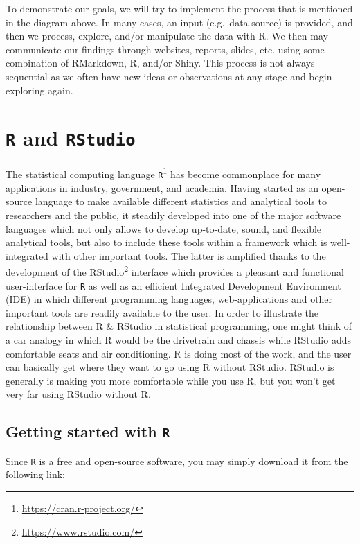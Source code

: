 \documentclass[12pt,]{krantz}
\renewcommand{\href}[2]{#2\footnote{\url{#1}}}
\begin{document}
To demonstrate our goals, we will try to implement the process that is
mentioned in the diagram above. In many cases, an input (e.g.~data
source) is provided, and then we process, explore, and/or manipulate the
data with R. We then may communicate our findings through websites,
reports, slides, etc. using some combination of RMarkdown, R, and/or
Shiny. This process is not always sequential as we often have new ideas
or observations at any stage and begin exploring again.

\section{\texorpdfstring{\texttt{R} and
\texttt{RStudio}}{R and RStudio}}\label{r-and-rstudio}

The statistical computing language
\href{https://cran.r-project.org/}{\texttt{R}} has become commonplace
for many applications in industry, government, and academia. Having
started as an open-source language to make available different
statistics and analytical tools to researchers and the public, it
steadily developed into one of the major software languages which not
only allows to develop up-to-date, sound, and flexible analytical tools,
but also to include these tools within a framework which is
well-integrated with other important tools. The latter is amplified
thanks to the development of the
\href{https://www.rstudio.com/}{RStudio} interface which provides a
pleasant and functional user-interface for \texttt{R} as well as an
efficient Integrated Development Environment (IDE) in which different
programming languages, web-applications and other important tools are
readily available to the user. In order to illustrate the relationship
between R \& RStudio in statistical programming, one might think of a
car analogy in which R would be the drivetrain and chassis while RStudio
adds comfortable seats and air conditioning. R is doing most of the
work, and the user can basically get where they want to go using R
without RStudio. RStudio is generally is making you more comfortable
while you use R, but you won't get very far using RStudio without R.

\subsection{\texorpdfstring{Getting started with
\texttt{R}}{Getting started with R}}\label{getting-started-with-r}

Since \texttt{R} is a free and open-source software, you may simply
download it from the following link:
\end{document}
